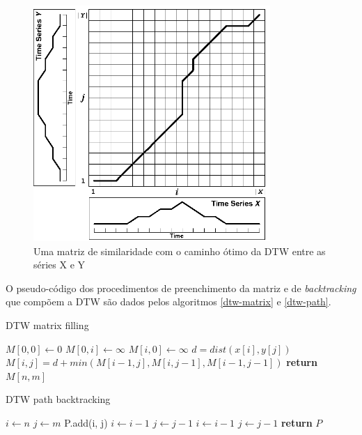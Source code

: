 \begin{figure}[htb]
\centering
\includegraphics[width=9cm]{figuras/dtw_warp_path.png}
\caption{Uma matriz de similaridade com o caminho ótimo da DTW entre as séries X e Y\citep{salvador2007toward}}
\label{fig:dtw-matrix-and-path}
\end{figure}

O pseudo-código dos procedimentos de preenchimento da matriz \citep{hierarchical-time-clustering} e de \textit{backtracking} que compõem a DTW são dados pelos algoritmos \ref{dtw-matrix} e \ref{dtw-path}.

\begin{algorithm}
\caption{DTW matrix filling}\label{dtw-matrix}
\begin{algorithmic}[1]
    \State $M[0, 0]\gets 0$
        \State $M[0, i] \gets \infty$
    \EndFor
        \State $M[i, 0] \gets \infty$
    \EndFor
            \State $d = dist(x[i], y[j])$
            \State $M[i, j] = d + min(M[i-1, j], M[i, j-1], M[i-1, j-1])$
        \EndFor
    \EndFor
\State \textbf{return} $M[n, m]$
\EndProcedure
\end{algorithmic}
\end{algorithm}

\begin{algorithm}
\caption{DTW path backtracking}\label{dtw-path}
\begin{algorithmic}[1]
    \State $i\gets n$
    \State $j\gets m$
        \State P.add(i, j)
            \State $i \gets i - 1$
            \State $j \gets j - 1$
            \State $i \gets i - 1$
        \Else
            \State $j \gets j - 1$
        \EndIf
    \EndWhile
\State \textbf{return} $P$
\EndProcedure
\end{algorithmic}
\end{algorithm}

